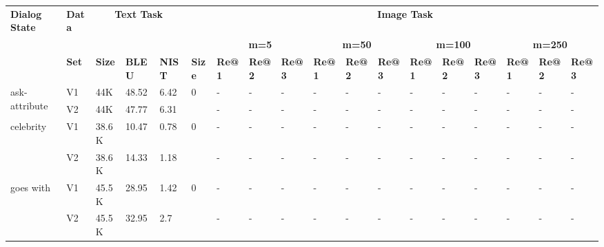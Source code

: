 \documentclass[letterpaper]{article} %
\begin{document}
\iffalse
\begin{table*}[!ht]
\centering
{\tiny
\captionsetup{font=small}
\begin{tabular}{|m{2cm}|m{0.2cm}||m{0.4cm}|m{0.4cm}|m{0.4cm}||m{0.4cm}||m{0.4cm}|m{0.4cm}|m{0.4cm}||m{0.4cm}|m{0.4cm}|m{0.4cm}||m{0.4cm}|m{0.4cm}|m{0.4cm}||m{0.4cm}|m{0.4cm}|m{0.4cm}|}\hline
 \textbf{Dialog State}& \textbf{Data} & \multicolumn{3}{c||}{\textbf{Text Task}} & & \multicolumn{12}{c|}{\textbf{Image Task}} \\ \cline{3-18}
  &  &  \multicolumn{3}{c||}{\textbf{}} & &  \multicolumn{3}{c||}{\textbf{m=5}} & \multicolumn{3}{c||}{\textbf{m=50}} &  \multicolumn{3}{c||}{\textbf{m=100}} &  \multicolumn{3}{c|}{\textbf{m=250}} \\ \cline{3-18}
  
 & \textbf{Set} & \textbf{Size} & \textbf{BLEU} & \textbf{NIST} & \textbf{Size} & \textbf{Re@1} & \textbf{Re@2} & \textbf{Re@3} & \textbf{Re@1} & \textbf{Re@2} & \textbf{Re@3} & \textbf{Re@1} & \textbf{Re@2} & \textbf{Re@3} & \textbf{Re@1} & \textbf{Re@2} & \textbf{Re@3}\\ \hline

\multirow{2}{1.8cm}{ask-attribute} 
& V1 & 44K &	48.52	& 6.42	&  \multirow{2}{*}{0}	& -&	-&	-& - &	 - &	-& - &	 - &	-& - &	 - &	-\\ \cline{2-5} \cline{7-18}
 & V2 & 44K	 & 47.77 &	6.31	& 	&-&	-&	-& - &	 - &	-& - &	 - &	-& - &	 - &	-\\ \hline 


\multirow{2}{1.8cm}{celebrity} 
& V1 & 38.6K	& 10.47 &	0.78 &	 \multirow{2}{*}{0}	&-&	-&	-& - &	 - &	-& - &	 - &	-& - &	 - &	-\\ \cline{2-5} \cline{7-18}
 & V2 & 38.6K	& 14.33 &	1.18 &		&-&	-&	-& - &	 - &	-& - &	 - &	-& - &	 - &	-\\ \hline 

\multirow{2}{1.8cm}{goes with}
& V1 & 45.5K	&28.95	&1.42&	 \multirow{2}{*}{0}&	-	&-	&-& - &	 - &	-& - &	 - &	-& - &	 - &	-\\ \cline{2-5} \cline{7-18}
 & V2 & 45.5K & 	32.95 &	2.7 &		&-&	-&	-& - &	 - &	-& - &	 - &	-& - &	 - &	-\\ \hline 


\end{tabular}}
\end{table*}
\end{document}
